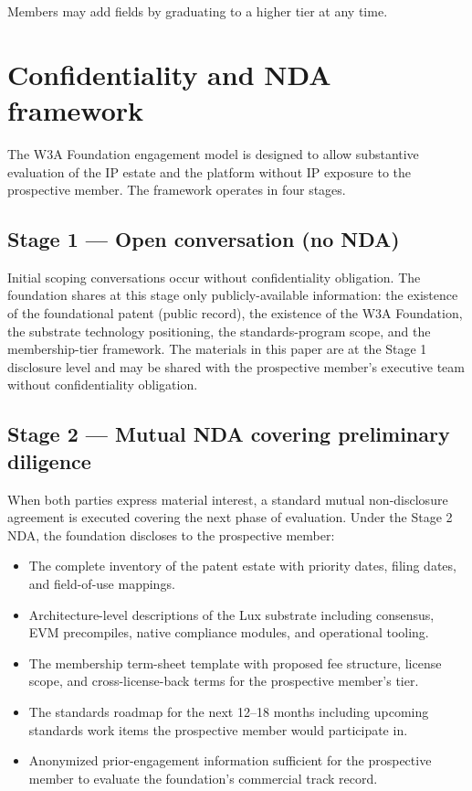 \documentclass[11pt,letterpaper]{article}
\begin{document}
Members may add fields by graduating to a higher tier at any time.

\section{Confidentiality and NDA framework}

The W3A Foundation engagement model is designed to allow substantive evaluation of the IP estate and the platform without IP exposure to the prospective member. The framework operates in four stages.

\subsection{Stage 1 --- Open conversation (no NDA)}

Initial scoping conversations occur without confidentiality obligation. The foundation shares at this stage only publicly-available information: the existence of the foundational patent (public record), the existence of the W3A Foundation, the substrate technology positioning, the standards-program scope, and the membership-tier framework. The materials in this paper are at the Stage 1 disclosure level and may be shared with the prospective member's executive team without confidentiality obligation.

\subsection{Stage 2 --- Mutual NDA covering preliminary diligence}

When both parties express material interest, a standard mutual non-disclosure agreement is executed covering the next phase of evaluation. Under the Stage 2 NDA, the foundation discloses to the prospective member:

\begin{itemize}
\item The complete inventory of the patent estate with priority dates, filing dates, and field-of-use mappings.
\item Architecture-level descriptions of the Lux substrate including consensus, EVM precompiles, native compliance modules, and operational tooling.
\item The membership term-sheet template with proposed fee structure, license scope, and cross-license-back terms for the prospective member's tier.
\item The standards roadmap for the next 12--18 months including upcoming standards work items the prospective member would participate in.
\item Anonymized prior-engagement information sufficient for the prospective member to evaluate the foundation's commercial track record.
\end{itemize}
\end{document}
